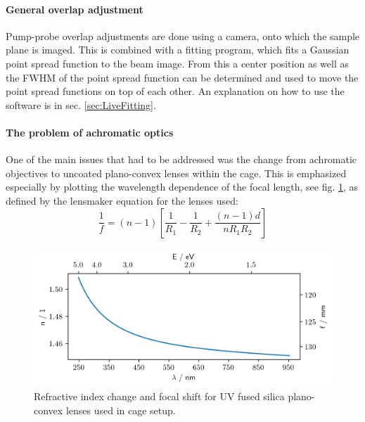 \documentclass[twoside,openright,listof=numbered]{scrreprt}
\begin{document}
\paragraph{General overlap adjustment}
Pump-probe overlap adjustments are done using a camera, onto which the sample plane is imaged. This is combined with a fitting program, which fits a Gaussian point spread function to the beam image. From this a center position as well as the FWHM of the point spread function can be determined and used to move the point spread functions on top of each other. An explanation on how to use the software is in sec. \ref{sec:LiveFitting}.

\paragraph{The problem of achromatic optics}
One of the main issues that had to be addressed was the change from achromatic objectives to uncoated plano-convex lenses within the cage.
This is emphasized especially by plotting the wavelength dependence of the focal length, see fig. \ref{fig:ChromFocalShift}, as defined by the lensmaker equation for the lenses used:
\begin{equation}
\frac{1}{f} = (n-1) \left[\frac{1}{R_1} - \frac{1}{R_2} + \frac{(n-1)d}{n R_1 R_2}\right]
\end{equation}
\begin{figure}[h]
\centering
\includegraphics[scale = 1]{images/ChromaticFocalShiftandDispersionUVFS.png} 
\caption{Refractive index change and focal shift for UV fused silica plano-convex lenses used in cage setup.\label{fig:ChromFocalShift}}
\end{figure}
\end{document}
